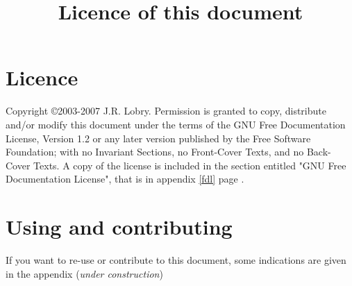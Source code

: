 \title{Licence of this document}
\section*{Licence}

    Copyright \copyright  2003-2007  J.R. Lobry.
    Permission is granted to copy, distribute and/or modify this document
    under the terms of the GNU Free Documentation License, Version 1.2
    or any later version published by the Free Software Foundation;
    with no Invariant Sections, no Front-Cover Texts, and no Back-Cover Texts.
    A copy of the license is included in the section entitled "GNU
    Free Documentation License", that is in appendix \ref{fdl} page \pageref{fdl}.

\section*{Using and contributing}

If you want to re-use or contribute to this document, some indications are
given in the appendix  (\emph{under construction})

